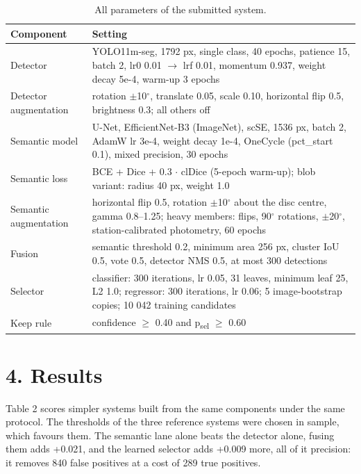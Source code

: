 \begin{table}[t]
\centering\footnotesize
\caption{All parameters of the submitted system.}
\begin{tabular}{@{}
  >{\raggedright\arraybackslash}p{}
  >{\raggedright\arraybackslash}p{}@{}}
\toprule
\begin{minipage}[b]{\linewidth}\raggedright
Component
\end{minipage} & \begin{minipage}[b]{\linewidth}\raggedright
Setting
\end{minipage} \\
\midrule
Detector & YOLO11m-seg, 1792 px, single class, 40 epochs, patience 15, batch 2, lr0 0.01 $\rightarrow$ lrf 0.01, momentum 0.937, weight decay 5e-4, warm-up 3 epochs \\
Detector augmentation & rotation $\pm$10$^\circ$, translate 0.05, scale 0.10, horizontal flip 0.5, brightness 0.3; all others off \\
Semantic model & U-Net, EfficientNet-B3 (ImageNet), scSE, 1536 px, batch 2, AdamW lr 3e-4, weight decay 1e-4, OneCycle (pct\_start 0.1), mixed precision, 30 epochs \\
Semantic loss & BCE + Dice + 0.3 $\cdot$ clDice (5-epoch warm-up); blob variant: radius 40 px, weight 1.0 \\
Semantic augmentation & horizontal flip 0.5, rotation $\pm$10$^\circ$ about the disc centre, gamma 0.8--1.25; heavy members: flips, 90$^\circ$ rotations, $\pm$20$^\circ$, station-calibrated photometry, 60 epochs \\
Fusion & semantic threshold 0.2, minimum area 256 px, cluster IoU 0.5, vote 0.5, detector NMS 0.5, at most 300 detections \\
Selector & classifier: 300 iterations, lr 0.05, 31 leaves, minimum leaf 25, L2 1.0; regressor: 300 iterations, lr 0.06; 5 image-bootstrap copies; 10 042 training candidates \\
Keep rule & confidence $\geq$ 0.40 and p\textsubscript{sel} $\geq$ 0.60 \\
\bottomrule
\end{tabular}
\end{table}

\section{4. Results}\label{results}

Table 2 scores simpler systems built from the same components under the same protocol. The
thresholds of the three reference systems were chosen in sample, which favours them. The semantic
lane alone beats the detector alone, fusing them adds +0.021, and the learned selector adds +0.009
more, all of it precision: it removes 840 false positives at a cost of 289 true positives.

